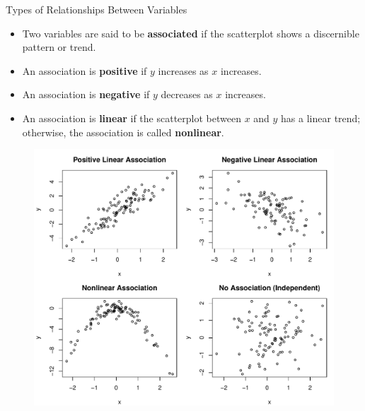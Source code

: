 \documentclass[11pt, fleqn]{beamer}\usepackage[]{graphicx}\usepackage[]{color}
\begin{document}
\begin{frame}{Types of Relationships Between Variables}
\begin{itemize}
\item Two variables are said to be \textbf{associated} if the scatterplot shows a discernible pattern or trend.
\vspace{5pt}
\item An association is \textbf{positive} if $y$ increases as $x$ increases.
\vspace{5pt}
\item An association is \textbf{negative} if $y$ decreases as $x$ increases.
\vspace{5pt}
\item An association is \textbf{linear} if the scatterplot between $x$ and $y$ has a linear trend; otherwise, the association is called \textbf{nonlinear}. 
\end{itemize}
\end{frame}

\begin{frame}
\centering
\begin{figure}
\includegraphics[scale=0.5]{figure/associations.pdf}
\end{figure}
\end{frame}
\end{document}
